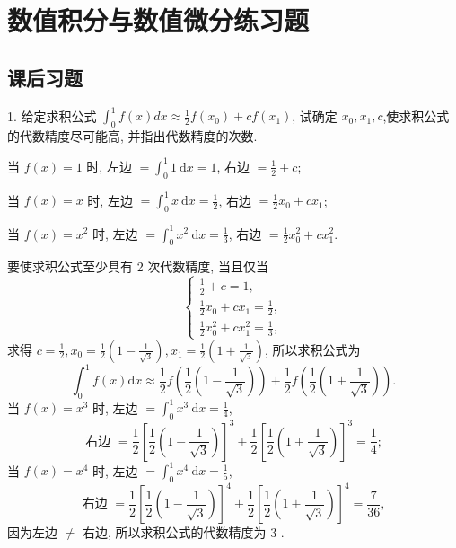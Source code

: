 \newpage
\section{数值积分与数值微分练习题}
\subsection{课后习题}
\begin{tcolorbox}[breakable,enhanced,arc=0mm,outer arc=0mm,
		boxrule=0pt,toprule=1pt,leftrule=0pt,bottomrule=1pt, rightrule=0pt,left=0.2cm,right=0.2cm,
		titlerule=0.5em,toptitle=0.1cm,bottomtitle=-0.1cm,top=0.2cm,
		colframe=white!10!biru,colback=white!90!biru,coltitle=white,
            coltext=black,title =2024-05, title style={white!10!biru}, before skip=8pt, after skip=8pt,before upper=\hspace{2em},
		fonttitle=\bfseries,fontupper=\normalsize]

 1. 给定求积公式 $ \displaystyle\int_{0}^{1} f(x) d x \approx \frac{1}{2} f\left(x_{0}\right)+c f\left(x_{1}\right) $, 试确定 $ x_{0}, x_{1}, c $,使求积公式的代数精度尽可能高, 并指出代数精度的次数.

 \tcblower
  当 $ f(x)=1 $ 时, 左边 $ =\int_{0}^{1} 1 \mathrm{~d} x=1 $, 右边 $ =\frac{1}{2}+c $;
  
  当 $ f(x)=x $ 时, 左边 $ =\int_{0}^{1} x \mathrm{~d} x=\frac{1}{2} $, 右边 $ =\frac{1}{2} x_{0}+c x_{1} $;
  
  当 $ f(x)=x^{2} $ 时, 左边 $ =\int_{0}^{1} x^{2} \mathrm{~d} x=\frac{1}{3} $, 右边 $ =\frac{1}{2} x_{0}^{2}+c x_{1}^{2} $.
  
  要使求积公式至少具有 2 次代数精度, 当且仅当
$$
\left\{\begin{array}{l}
\frac{1}{2}+c=1, \\
\frac{1}{2} x_{0}+c x_{1}=\frac{1}{2}, \\
\frac{1}{2} x_{0}^{2}+c x_{1}^{2}=\frac{1}{3},
\end{array}\right.
$$
求得 $ c=\frac{1}{2}, x_{0}=\frac{1}{2}\left(1-\frac{1}{\sqrt{3}}\right), x_{1}=\frac{1}{2}\left(1+\frac{1}{\sqrt{3}}\right) $, 所以求积公式为
$$
\int_{0}^{1} f(x) \mathrm{d} x \approx \frac{1}{2} f\left(\frac{1}{2}\left(1-\frac{1}{\sqrt{3}}\right)\right)+\frac{1}{2} f\left(\frac{1}{2}\left(1+\frac{1}{\sqrt{3}}\right)\right) .
$$
当 $ f(x)=x^{3} $ 时, 左边 $ =\int_{0}^{1} x^{3} \mathrm{~d} x=\frac{1}{4} $,
$$
\text { 右边 }=\frac{1}{2}\left[\frac{1}{2}\left(1-\frac{1}{\sqrt{3}}\right)\right]^{3}+\frac{1}{2}\left[\frac{1}{2}\left(1+\frac{1}{\sqrt{3}}\right)\right]^{3}=\frac{1}{4} \text {; }
$$
当 $ f(x)=x^{4} $ 时, 左边 $ =\int_{0}^{1} x^{4} \mathrm{~d} x=\frac{1}{5} $,
$$
\text { 右边 }=\frac{1}{2}\left[\frac{1}{2}\left(1-\frac{1}{\sqrt{3}}\right)\right]^{4}+\frac{1}{2}\left[\frac{1}{2}\left(1+\frac{1}{\sqrt{3}}\right)\right]^{4}=\frac{7}{36} \text {, }
$$
因为左边 $ \neq $ 右边, 所以求积公式的代数精度为 3 .
\end{tcolorbox}

